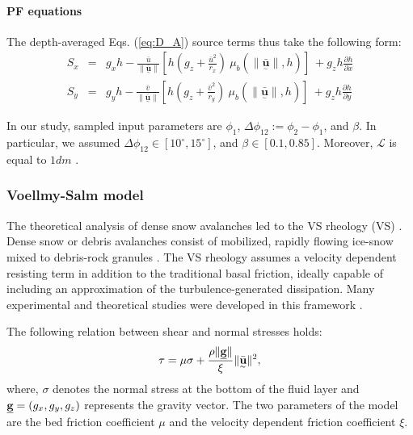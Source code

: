 \documentclass{article}
\begin{document}
\paragraph{PF equations} The depth-averaged Eqs. (\ref{eq:D_A}) source terms thus take the following form:
\begin{eqnarray}\label{eq:S_terms_PF}
S_{x} &=&  g_{x} h -  \frac{\bar{u}}{\| \underset{^\sim}{\bar{\textbf{u}}} \|}\left[h \left(g_z+\frac{\bar{u}^2}{r_x}\right) \ \mu_{b}(\|\underset{^\sim}{\bar{\textbf{u}}} \| , h)\right] \ + g_{z}h\frac{\partial h}{\partial x} \nonumber \\
S_{y} &=&  g_{y} h - \frac{\bar{v}}{\| \underset{^\sim}{\bar{\textbf{u}}} \|}\left[h \left(g_z +\frac{\bar{v}^2}{r_y}\right) \ \mu_{b}(\|\underset{^\sim}{\bar{\textbf{u}}} \| , h)\right] \ + g_{z}h\frac{\partial h}{\partial y}
\end{eqnarray}

In our study, sampled input parameters are $\phi_1$, $\Delta \phi_{12}:=\phi_2-\phi_1$, and $\beta$. In particular, we assumed $\Delta \phi_{12} \in [10^{\mathrm{\circ}}, 15^{\mathrm{\circ}}]$, and $\beta \in [0.1, 0.85]$. Moreover, %
$\mathcal{L}$ is equal to $1 dm$ \citep{PouliquenForterre2002,ForterrePouliquen2003}.

\subsubsection{Voellmy-Salm model}\label{VSM}
The theoretical analysis of dense snow avalanches led to the VS rheology (VS) \citep{Voellmy1955, Salm1990, Salm1993, Bartelt1999}. Dense snow or debris avalanches consist of mobilized, rapidly flowing ice-snow mixed to debris-rock granules \citep{BarteltMcArdell2009}. The VS rheology assumes a velocity dependent resisting term in addition to the traditional basal friction, ideally capable of including an approximation of the turbulence-generated dissipation. Many experimental and theoretical studies were developed in this framework \citep{Gruber2007, Kern2009, Christen2010, Fischer2012}.

The following relation between shear and normal stresses holds:
\begin{equation}
\tau = \mu \sigma + \frac{\rho \| \underline{\textbf g} \|}{\xi} \| \underset{^\sim}{\bar{\textbf u}} \|^2,
\end{equation}
where, $\sigma$ denotes the normal stress at the bottom of the fluid layer and $\underline{\textbf g} = (g_{x} , g_{y} , g_{z})$ represents the gravity vector. The two parameters of the model are the bed friction coefficient $\mu$ and the velocity dependent friction coefficient $\xi$.
\end{document}
